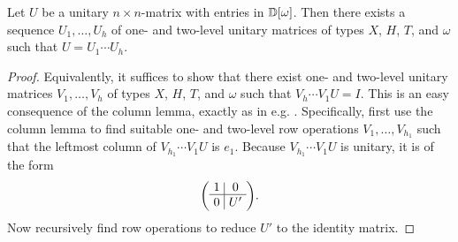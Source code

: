 \begin{lemma}\label{lem-matrix-decomposition}
  Let $U$ be a unitary $n\times n$-matrix with entries in $\mathbb{D}[\omega]$. Then there exists a sequence
  $U_1,\ldots,U_h$ of one- and two-level unitary matrices of types $X$, $H$, $T$, and $\omega$ such
  that $U=U_1\cdots U_h$.
\end{lemma}

\begin{proof}
  Equivalently, it suffices to show that there exist one- and two-level unitary matrices
  $V_1,\ldots,V_h$ of types $X$, $H$, $T$, and $\omega$ such that $V_h\cdots V_1U=I$. This is an
  easy consequence of the column lemma, exactly as in e.g. {\cite[Sec.~4.5.1]{neilsen2000:QuantumComputationAndInfo}}.
  Specifically, first use the column lemma to find suitable one- and two-level row operations
  $V_1,\ldots,V_{h_1}$ such that the leftmost column of $V_{h_1}\cdots V_1 U$ is $e_1$. Because
  $V_{h_1}\cdots V_1 U$ is unitary, it is of the form
  \[ 
    \zmatrix{c|c}{1&0\\\hline \rule{0mm}{2.1ex}0&U'}.
  \]
  Now recursively find row operations to reduce $U'$ to the identity matrix.
\end{proof}

